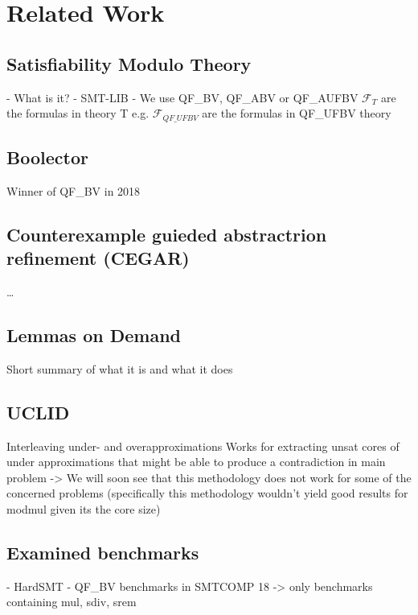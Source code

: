 \chapter{Related Work}
\label{ch:related_work}
\section{Satisfiability Modulo Theory}
- What is it?
- SMT-LIB
- We use QF\_BV, QF\_ABV or QF\_AUFBV
$\mathcal{F}_{T}$ are the formulas in theory T e.g. $\mathcal{F}_{QF\_UFBV}$ are the formulas in QF\_UFBV theory
\section{Boolector}
Winner of QF\_BV in 2018 
\section{Counterexample guieded abstractrion refinement (CEGAR)}
\dots
\section{Lemmas on Demand}
Short summary of what it is and what it does
\section{UCLID}
Interleaving under- and overapproximations
Works for extracting unsat cores of under approximations that might be able to produce a contradiction in main problem
-> We will soon see that this methodology does not work for some of the concerned problems (specifically this methodology wouldn't yield good results for modmul given its the core size)
\section{Examined benchmarks}
- HardSMT
- QF\_BV benchmarks in SMTCOMP 18 -> only benchmarks containing mul, sdiv, srem